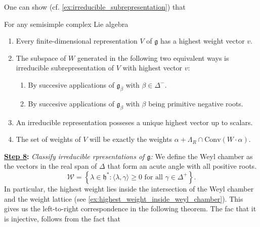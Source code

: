 \documentclass{report}
\begin{document}
One can show (cf. \cref{ex:irreducible_subrepresentation}) that
\begin{proposition}
    For any semisimple complex Lie algebra
    \begin{enumerate}[label = (\roman*)]
        \item Every finite-dimensional representation $V$ of $\mathfrak g$ has a highest weight vector $v$.
        \item The subspace of $W$ generated in the following two equivalent ways is irreducible subrepresentation of $V$ with highest vector $v$:
        \begin{enumerate}[label = (\alph*)]
            \item By succesive applications of $\mathfrak g_\beta$ with $\beta \in \Delta^-$.
            \item By succesive applications of $\mathfrak g_\beta$ with $\beta$ being primitive negative roots. 
        \end{enumerate}
        \item An irreducible representation posseses a unique highest vector up to scalars.
        \item The set of weights of $V$ will be exactly the weights $\alpha + \Lambda_R \cap \mathrm{Conv}(W \cdot \alpha)$.
    \end{enumerate}
\end{proposition}




{\bf \underline{Step 8}:} \emph{Classify irreducible rpresentations of $\mathfrak g$:}
We define the Weyl chamber as the vectors in the real span of $\Delta$ that form an acute angle with all positive roots.
\[
\mathcal W = \left\{ \lambda \in \mathfrak h^*: \langle \lambda, \gamma \rangle \geq 0 \text{ for all } \gamma \in \Delta^+ \right\}.
\]
In particular, the highest weight lies inside the intersection of the Weyl chamber and the weight lattice (see \cref{ex:highest_weight_inside_weyl_chamber}).
This gives us the left-to-right correspondence in the following theorem.
The fac that it is injective, follows from the fact that 
\end{document}
